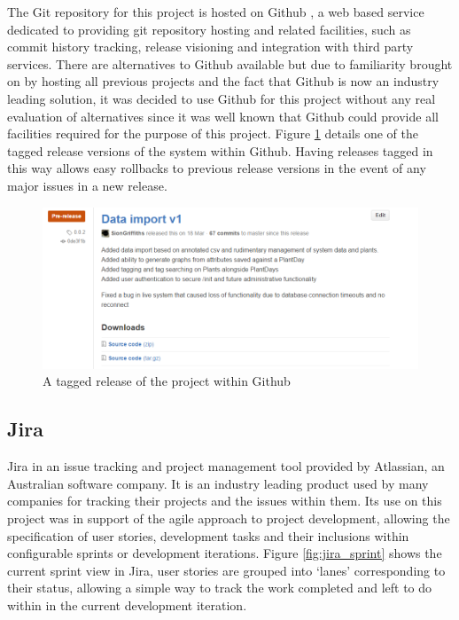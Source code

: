 The Git repository for this project is hosted on Github \cite{_gitHub}, a web based service dedicated to providing git repository hosting and related facilities, such as commit history tracking, release visioning and integration with third party services. There are alternatives to Github available but due to familiarity brought on by hosting all previous projects and the fact that Github is now an industry leading solution, it was decided to use Github for this project without any real evaluation of alternatives since it was well known that Github could provide all facilities required for the purpose of this project. Figure \ref{fig:gitrel} details one of the tagged release versions of the system within Github. Having releases tagged in this way allows easy rollbacks to previous release versions in the event of any major issues in a new release. 

\begin{figure}[H]
    \centering
    \includegraphics[width=\textwidth]{images/tools/gitrel}
    \caption{A tagged release of the project within Github}
    \label{fig:gitrel}
\end{figure}

\subsection{Jira}

Jira \cite{jira} in an issue tracking and project management tool provided by Atlassian, an Australian software company. It is an industry leading product used by many companies for tracking their projects and the issues within them. Its use on this project was in support of the agile approach to project development, allowing the specification of user stories, development tasks and their inclusions within configurable sprints or development iterations. Figure \ref{fig:jira_sprint} shows the current sprint view in Jira, user stories are grouped into `lanes' corresponding to their status, allowing a simple way to track the work completed and left to do within in the current development iteration.

